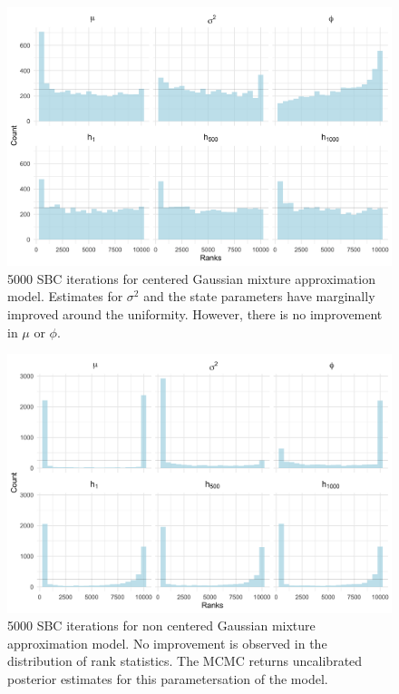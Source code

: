 \documentclass[12pt, a4paper]{article}
\begin{document}
    \begin{figure}[H]
        \centering
        \includegraphics[scale=0.09]{results/ksc_cp_5k.png}
        \caption{5000 SBC iterations for centered Gaussian mixture approximation model. Estimates for $\sigma^2$ and the state parameters have marginally improved around the uniformity. However, there is no improvement in $\mu$ or $\phi$.}
        \label{fig:cpksc5k}
    \end{figure}

    \begin{figure}[H]
        \centering
        \includegraphics[scale=0.09]{results/ksc_ncp_5k.png}
        \caption{5000 SBC iterations for non centered Gaussian mixture approximation model. No improvement is observed in the distribution of rank statistics. The MCMC returns uncalibrated posterior estimates for this parametersation of the model.}
        \label{fig:ncpksc5k}
    \end{figure}
\end{document}
